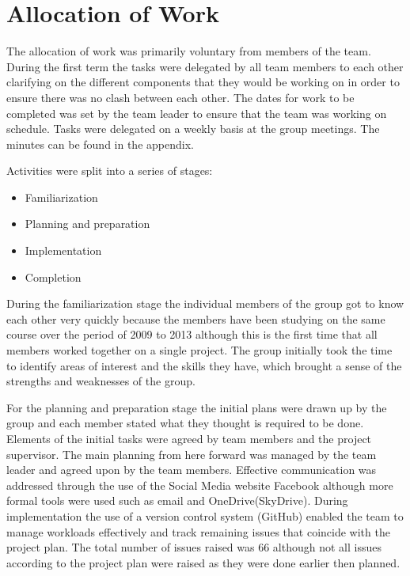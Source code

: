 \section{Allocation of Work}
\label{sec:allocation_of_work}

The allocation of work was primarily voluntary from members of the team. During the first term the tasks were delegated by all team members to each other clarifying on the different components that they would be working on in order to ensure there was no clash between each other. The dates for work to be completed was set by the team leader to ensure that the team was working on schedule. Tasks were delegated on a weekly basis at the group meetings. The minutes can be found in the appendix. 

Activities were split into a series of stages:

\begin{itemize}
    \item Familiarization
    \item Planning and preparation
    \item Implementation
    \item Completion
\end{itemize}

During the familiarization stage the individual members of the group got to know each other very quickly because the members have been studying on the same course over the period of 2009 to 2013 although this is the first time that all members worked together on a single project. The group initially took the time to identify areas of interest and the skills they have, which brought a sense of the strengths and weaknesses of the group.

For the planning and preparation stage the initial plans were drawn up by the group and each member stated what they thought is required to be done. Elements of the initial tasks were agreed by team members and the project supervisor. The main planning from here forward was managed by the team leader and agreed upon by the team members. Effective communication was addressed through the use of the Social Media website Facebook although more formal tools were used such as email and OneDrive(SkyDrive). During implementation the use of a version control system (GitHub) enabled the team to manage workloads effectively and track remaining issues that coincide with the project plan. The total number of issues raised was 66 although not all issues according to the project plan were raised as they were done earlier then planned. 

